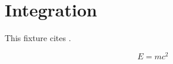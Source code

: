 \section{Integration}
\label{sec:integration}
This fixture cites \cite{knuth1984texbook}.

\begin{equation}
E = mc^2
\label{eq:einstein}
\end{equation}

